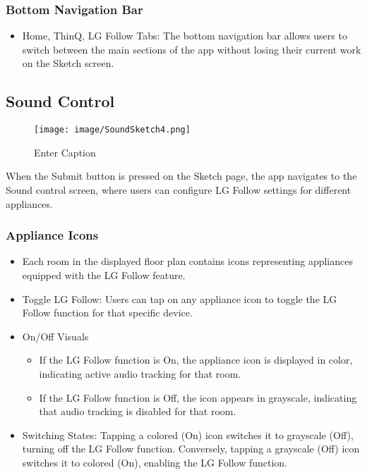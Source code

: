 \documentclass[conference]{IEEEtran}
\begin{document}
\subsubsection{Bottom Navigation Bar}
\begin{itemize}
    \item Home, ThinQ, LG Follow Tabs: The bottom navigation bar allows users to switch between the main sections of the app without losing their current work on the Sketch screen.\\
\end{itemize}

\subsection{Sound Control}

\begin{figure}[h!]
    \centering
    \texttt{[image: image/SoundSketch4.png]}
    \caption{Enter Caption}
    \label{fig:enter-label}
    
    
\end{figure}

\noindent When the Submit button is pressed on the Sketch page, the app navigates to the Sound control screen, where users can configure LG Follow settings for different appliances.

\subsubsection{Appliance Icons}
\begin{itemize}
    \item  Each room in the displayed floor plan contains icons representing appliances equipped with the LG Follow feature.\\
    \item Toggle LG Follow: Users can tap on any appliance icon to toggle the LG Follow function for that specific device.\\
    \item On/Off Visuals
\begin{itemize}
    \item If the LG Follow function is On, the appliance icon is displayed in color, indicating active audio tracking for that room.\\
    \item If the LG Follow function is Off, the icon appears in grayscale, indicating that audio tracking is disabled for that room.\\
\end{itemize}
\end{itemize}
\begin{itemize}
    \item Switching States: Tapping a colored (On) icon switches it to grayscale (Off), turning off the LG Follow function. Conversely, tapping a grayscale (Off) icon switches it to colored (On), enabling the LG Follow function.\\
\end{itemize}
\end{document}
